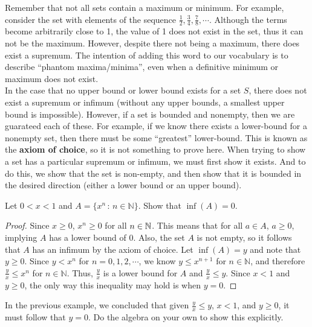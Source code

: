 Remember that not all sets contain a maximum or minimum. For example, consider the set with elements of the sequence $\frac{1}{2},\frac{3}{4},\frac{7}{8},\cdots$. Although the terms become arbitrarily close to 1, the value of 1 does not exist in the set, thus it can not be the maximum. However, despite there not being a maximum, there does exist a supremum. The intention of adding this word to our vocabulary is to describe ``phantom maxima/minima'', even when a definitive minimum or maximum does not exist.\\

In the case that no upper bound or lower bound exists for a set $S$, there does not exist a supremum or infimum (without any upper bounds, a smallest upper bound is impossible). However, if a set is bounded and nonempty, then we are guarateed each of these. For example, if we know there exists a lower-bound for a nonempty set, then there must be some ``greatest'' lower-bound. This is known as the \textbf{axiom of choice}, so it is not something to prove here. When trying to show a set has a particular supremum or infimum, we must first show it exists. And to do this, we show that the set is non-empty, and then show that it is bounded in the desired direction (either a lower bound or an upper bound). 

\begin{example}
    Let $0<x<1$ and $A=\{x^n\, :\, n\in\mathbb{N}\}$. Show that $\inf(A)=0$.\\

    \begin{proof}
        Since $x\geq 0$, $x^n\geq 0$ for all $n\in\mathbb{N}$. This means that for all $a\in A$, $a\geq 0$, implying $A$ has a lower bound of 0. Also, the set $A$ is not empty, so it follows that $A$ has an infimum by the axiom of choice. Let $\inf(A)=y$ and note that $y\geq 0$. Since $y<x^n$ for $n=0,1,2,\cdots$, we know $y\leq x^{n+1}$ for $n\in\mathbb{N}$, and therefore $\frac{y}{x}\leq x^n$ for $n\in\mathbb{N}$. Thus, $\frac{y}{x}$ is a lower bound for $A$ and $\frac{y}{x}\leq y$. Since $x<1$ and $y\geq 0$, the only way this inequality may hold is when $y=0$.
    \end{proof}
\end{example}

\begin{exercise}
    In the previous example, we concluded that given $\frac{y}{x}\leq y$, $x<1$, and $y\geq 0$, it must follow that $y=0$. Do the algebra on your own to show this explicitly.
\end{exercise}

